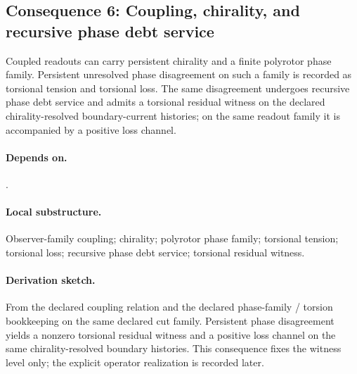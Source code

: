 \subsection{Consequence 6: Coupling, chirality, and recursive phase debt service}
\begin{consequence}\label{cons:c6}
Coupled readouts can carry persistent chirality and a finite polyrotor phase family. Persistent unresolved phase disagreement on such a family is recorded as torsional tension and torsional loss. The same disagreement undergoes recursive phase debt service and admits a torsional residual witness on the declared chirality-resolved boundary-current histories; on the same readout family it is accompanied by a positive loss channel.
\end{consequence}
\paragraph{Depends on.} .
\paragraph{Local substructure.} Observer-family coupling; chirality; polyrotor phase family; torsional tension; torsional loss; recursive phase debt service; torsional residual witness.
\paragraph{Derivation sketch.} From the declared coupling relation and the declared phase-family / torsion bookkeeping on the same declared cut family. Persistent phase disagreement yields a nonzero torsional residual witness and a positive loss channel on the same chirality-resolved boundary histories. This consequence fixes the witness level only; the explicit operator realization is recorded later.

